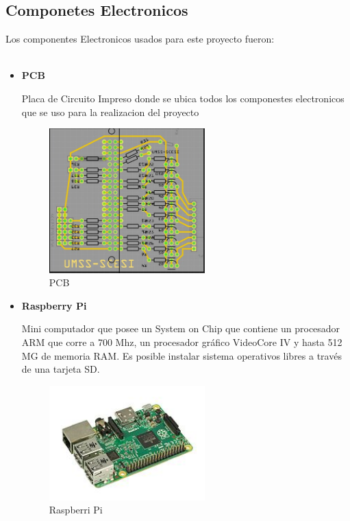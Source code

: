 \documentclass[letterpaper,12pt]{article}
\begin{document}
{		\subsection{Componetes Electronicos}
		Los componentes Electronicos usados para este proyecto fueron:\\\\
		\begin{itemize}
			
			\item \textbf{PCB}
			
			Placa de Circuito Impreso donde  se ubica todos los componestes electronicos que se uso para la realizacion del proyecto
			
			\begin{figure}[h]
				\centering
				\begin{minipage}[t]{5.5cm}
					\includegraphics[width=6cm]{images/PCB.jpeg}	 %
					\caption{ PCB}
				\end{minipage}
				
			\end{figure}
			
			
			\item \textbf{Raspberry Pi}
			
			Mini computador que  posee un System on Chip que contiene un procesador ARM que corre a 700 Mhz, un procesador gráfico VideoCore IV y hasta 512 MG de memoria RAM. Es posible instalar sistema operativos libres a través de una tarjeta SD.
			
			\begin{figure}[h]
				\centering
				\begin{minipage}[t]{5.5cm}
					\includegraphics[width=6cm]{images/RaspberryPI.jpg}	 %
					\caption{ Raspberri Pi}
				\end{minipage}
				

\end{figure}
\end{itemize}}
\end{document}
